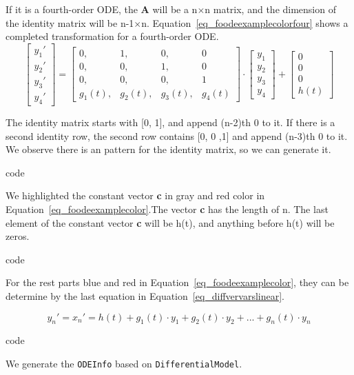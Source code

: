If it is a fourth-order ODE, the \textbf{A} will be a n$\times$n matrix, and the dimension of the identity matrix will be n-1$\times$n. Equation~\ref{eq_foodeexamplecolorfour} shows a completed transformation for a fourth-order ODE.
\begin{equation} \label{eq_foodeexamplecolorfour}
	\begin{bmatrix}
		{y_{1}'} \\
    {y_{2}'} \\
    {y_{3}'} \\
    {y_{4}'}
	\end{bmatrix}
    = 
  \begin{bmatrix}
		{0}, & {1}, & {0}, & {0} \\
    {0}, & {0}, & {1}, & {0} \\
    {0}, & {0}, & {0}, & {1} \\
    {g_{1}(t)}, & {g_{2}(t)}, & {g_{3}(t)}, & {g_{4}(t)}
	\end{bmatrix}
    \cdot
  \begin{bmatrix}
		{y_{1}} \\
    {y_{2}} \\
    {y_{3}} \\
    {y_{4}}
	\end{bmatrix}
    + 
  \begin{bmatrix}
    {0} \\
    {0} \\
    {0} \\
    {h(t)}
	\end{bmatrix}
\end{equation}

The identity matrix starts with [0, 1], and append (n-2)th 0 to it. If there is a second identity row, the second row contains [0, 0 ,1] and append (n-3)th 0 to it. We observe there is an pattern for the identity matrix, so we can generate it.

code

We highlighted the constant vector \textbf{c} in gray and red color in Equation~\ref{eq_foodeexamplecolor}.The vector \textbf{c} has the length of n. The last element of the constant vector \textbf{c} will be h(t), and anything before h(t) will be zeros.

code

For the rest parts blue and red in Equation~\ref{eq_foodeexamplecolor}, they can be determine by the last equation in Equation~\ref{eq_diffvervarslinear}.

\begin{equation}
  y_{n}' = x_{n}'= h(t) + g_{1}(t) \cdot y_{1} + g_{2}(t) \cdot y_{2} + ... + g_{n}(t) \cdot y_{n}
\end{equation}

code

We generate the \verb|ODEInfo| based on \verb|DifferentialModel|.
